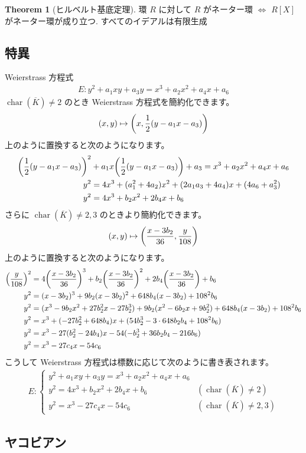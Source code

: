 \documentclass[a4paper,dvipdfmx]{jsarticle}
\theoremstyle{definition}
\newtheorem{thm}[dfn]{Theorem}
\DeclareMathOperator{\ch}{char}
\begin{document}
\begin{thm}[ヒルベルト基底定理]
  環 $R$ に対して $R$ がネーター環 $\iff$ $R[X]$ がネーター環が成り立つ.
  すべてのイデアルは有限生成
\end{thm}

\subsection{特異}
Weierstrass 方程式
\begin{align}
  E: y^2 + a_1xy + a_3y = x^3 + a_2x^2 + a_4x + a_6
\end{align}
$\ch(\overline{K}) \neq 2$ のとき Weierstrass 方程式を簡約化できます。
\begin{align}
  (x, y)\mapsto\qty(x, \frac{1}{2}(y - a_1x - a_3))
\end{align}
上のように置換すると次のようになります。
\begin{align}
  \qty(\frac{1}{2}(y - a_1x - a_3))^2 & + a_1x\qty(\frac{1}{2}(y - a_1x - a_3)) + a_3 = x^3 + a_2x^2 + a_4x + a_6 \\
  y^2                                 & = 4x^3 + (a_1^2 + 4a_2)x^2 + (2a_1a_3 + 4a_4)x + (4a_6 + a_3^2)           \\
  y^2                                 & = 4x^3 + b_2x^2 + 2b_4x + b_6
\end{align}
さらに $\ch(\overline{K}) \neq 2, 3$ のときより簡約化できます。
\begin{align}
  (x, y)\mapsto\qty(\frac{x - 3b_2}{36}, \frac{y}{108})
\end{align}
上のように置換すると次のようになります。
\begin{align}
  \qty(\frac{y}{108})^2 & = 4\qty(\frac{x - 3b_2}{36})^3 + b_2\qty(\frac{x - 3b_2}{36})^2 + 2b_4\qty(\frac{x - 3b_2}{36}) + b_6 \\
  y^2                   & = (x - 3b_2)^3 + 9b_2(x - 3b_2)^2 + 648b_4(x - 3b_2) + 108^2b_6                                       \\
  y^2                   & = (x^3 - 9b_2x^2 + 27b_2^2x - 27b_2^3) + 9b_2(x^2 - 6b_2x + 9b_2^2) + 648b_4(x - 3b_2) + 108^2b_6     \\
  y^2                   & = x^3 + (-27b_2^2 + 648b_4)x + (54b_2^3 - 3\cdot 648b_2b_4 + 108^2b_6)                                \\
  y^2                   & = x^3 - 27(b_2^2 - 24b_4)x - 54(- b_2^3 + 36b_2b_4 - 216b_6)                                          \\
  y^2                   & = x^3 - 27c_4x - 54c_6
\end{align}
こうして Weierstrass 方程式は標数に応じて次のように書き表されます。
\begin{align}
  E:\begin{cases}
      y^2 + a_1xy + a_3y = x^3 + a_2x^2 + a_4x + a_6                    \\
      y^2 = 4x^3 + b_2x^2 + 2b_4x + b_6 & (\ch(\overline{K}) \neq 2)    \\
      y^2 = x^3 - 27c_4x - 54c_6        & (\ch(\overline{K}) \neq 2, 3)
    \end{cases}
\end{align}
\subsection{ヤコビアン}
\end{document}
